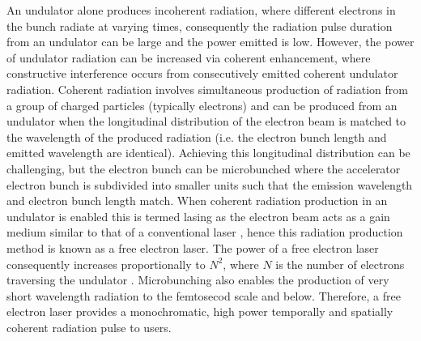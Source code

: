 \documentclass[../main.tex]{subfiles}
\begin{document}
An undulator alone produces incoherent radiation, where different electrons in the bunch radiate at varying times, consequently the radiation pulse duration from an undulator can be large and the power emitted is low. However, the power of undulator radiation can be increased via coherent enhancement, where constructive interference occurs from consecutively emitted coherent undulator radiation. Coherent radiation involves simultaneous production of radiation from a group of charged particles (typically electrons) and can be produced from an undulator when the longitudinal distribution of the electron beam is matched to the wavelength of the produced radiation (i.e. the electron bunch length and emitted wavelength are identical). Achieving this longitudinal distribution can be challenging, but the electron bunch can be microbunched where the accelerator electron bunch is subdivided into smaller units such that the emission wavelength and electron bunch length match. When coherent radiation production in an undulator is enabled this is termed lasing as the electron beam acts as a gain medium similar to that of a conventional laser \cite{brau1988free}, hence this radiation production method is known as a free electron laser. The power of a free electron laser consequently increases proportionally to $N^{2}$, where $N$ is the number of electrons traversing the undulator \cite{pellegrini2016physics}. Microbunching also enables the production of very short wavelength radiation to the femtosecod scale and below. Therefore, a free electron laser provides a monochromatic, high power temporally and spatially coherent radiation pulse to users.
\end{document}

